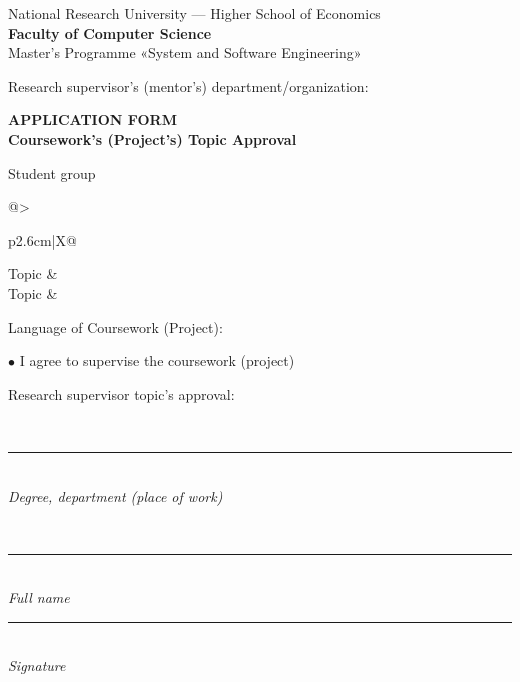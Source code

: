 \documentclass[12pt,a4paper]{article}
\newcommand{\hseSignField}[2]{%
  \begin{minipage}[t]{#1}\centering
    \rule{\linewidth}{0.4pt}\\[-2pt]{\footnotesize\itshape #2}
  \end{minipage}}
\newcommand{\hseFilledField}[3]{%
  \begin{minipage}[t]{#1}\centering
    {\small #2}\\[-4pt]\rule{\linewidth}{0.4pt}\\[-2pt]{\footnotesize\itshape #3}
  \end{minipage}}
\begin{document}
\clearpage
\begin{otherlanguage}{english}
\begin{center}
National Research University --- Higher School of Economics\\[4pt]
\textbf{Faculty of Computer Science}\\[4pt]
Master's Programme «System and Software Engineering»
\end{center}

\vspace{0.6cm}
\begin{minipage}[t]{0.5\textwidth}\raggedright
\small Research supervisor's (mentor's) department/organization:\\
\foreignlanguage{russian}{\hseSupervisorDepartment}
\end{minipage}

\vspace{0.6cm}
\begin{center}
\textbf{APPLICATION FORM}\\
\textbf{Coursework's (Project's) Topic Approval}
\end{center}

\vspace{0.4cm}
Student \underline{} group \underline{}

\vspace{0.6cm}
\begin{tabularx}{\textwidth}{@{}>{\raggedright\arraybackslash}p{2.6cm}|X@{}}
Topic & \foreignlanguage{russian}{\hseTitleRu} \\[0.6cm]
Topic & \hseTitleEn \\
\end{tabularx}

\vspace{0.6cm}
Language of Coursework (Project): \underline{\makebox[4cm][l]{\ \hseWorkLangEn}}

\vspace{0.5cm}
$\bullet$ I agree to supervise the coursework (project)

\vspace{0.3cm}
\begin{minipage}[t]{0.27\textwidth}\raggedright Research supervisor topic's approval:\end{minipage}%
\hseFilledField{0.3\textwidth}{\foreignlanguage{russian}{\hseSupervisorTitle\ifdefempty{\hseSupervisorDegree}{}{, \hseSupervisorDegree}}}{Degree, department (place of work)}\hfill
\hseFilledField{0.22\textwidth}{\foreignlanguage{russian}{\hseSupervisorName}}{Full name}\hfill
\hseSignField{0.15\textwidth}{Signature}


\end{otherlanguage}
\end{document}
